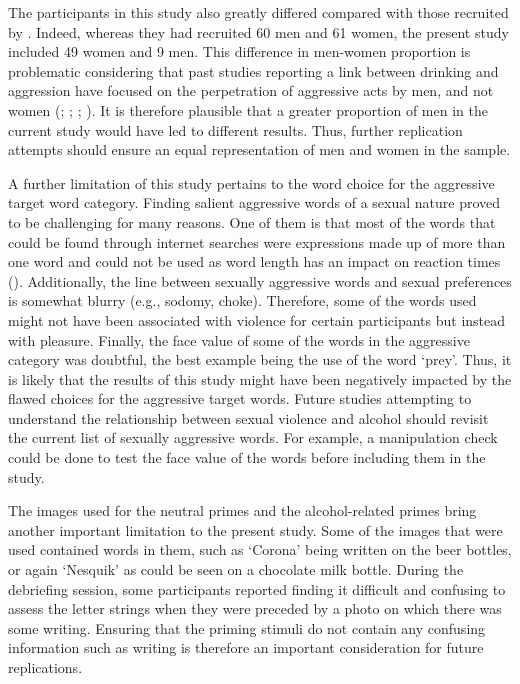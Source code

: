 \documentclass[serif, twocolumn, numeric, empirical]{jote-article}
\begin{document}
The participants in this study also greatly differed compared with those recruited by \textcite{BartholowHeinz2006}. Indeed, whereas they had recruited 60 men and 61 women, the present study included 49 women and 9 men. This difference in men-women proportion is problematic considering that past studies reporting a link between drinking and aggression have focused on the perpetration of aggressive acts by men, and not women (\cite{JakupcakLisakRoemer2002}; \cite{GidyczWarkentinOrchowski2007}; \cite{AbbeyClintonSherrodMcAuslanZawackiBuck2003}; \cite{LockeMahalik2005}). It is therefore plausible that a greater proportion of men in the current study would have led to different results. Thus, further replication attempts should ensure an equal representation of men and women in the sample.

A further limitation of this study pertains to the word choice for the aggressive target word category. Finding salient aggressive words of a sexual nature proved to be challenging for many reasons. One of them is that most of the words that could be found through internet searches were expressions made up of more than one word and could not be used as word length has an impact on reaction times (\cite{BartholowHeinz2006}). Additionally, the line between sexually aggressive words and sexual preferences is somewhat blurry (e.g., sodomy, choke). Therefore, some of the words used might not have been associated with violence for certain participants but instead with pleasure. Finally, the face value of some of the words in the aggressive category was doubtful, the best example being the use of the word ‘prey’. Thus, it is likely that the results of this study might have been negatively impacted by the flawed choices for the aggressive target words. Future studies attempting to understand the relationship between sexual violence and alcohol should revisit the current list of sexually aggressive words. For example, a manipulation check could be done to test the face value of the words before including them in the study.

The images used for the neutral primes and the alcohol-related primes bring another important limitation to the present study. Some of the images that were used contained words in them, such as ‘Corona’ being written on the beer bottles, or again ‘Nesquik’ as could be seen on a chocolate milk bottle. During the debriefing session, some participants reported finding it difficult and confusing to assess the letter strings when they were preceded by a photo on which there was some writing. Ensuring that the priming stimuli do not contain any confusing information such as writing is therefore an important consideration for future replications.
\end{document}
